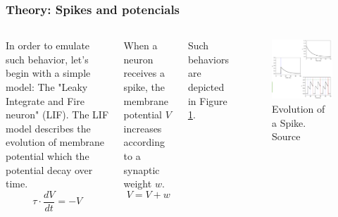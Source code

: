 \begin{frame}
	\frametitle{Theory: Spikes and potencials}
	
	\begin{columns}
			\par In order to emulate such behavior, let's begin with a simple model: The "Leaky Integrate and Fire neuron" (LIF). The LIF model describes the evolution of membrane potential which the potential decay over time.
			\begin{equation}
				\tau \cdot \frac{dV}{dt} = -V
				\label{eq:leak}
			\end{equation}
			
			\par When a neuron receives a spike, the membrane potential $V$ increases according to a synaptic weight $w$.
			\begin{equation}
				V = V + w
			\end{equation}
			
			\par Such behaviors are depicted in Figure \ref{fig:neuronspikes2}.
			\begin{figure}
				\centering
				\includegraphics[width=.87\linewidth]{images/neuronSpikes2}
				\caption{Evolution of a Spike. Source \cite{dan_goodman_2022_7044500}}
				\label{fig:neuronspikes2}
			\end{figure}
	\end{columns}

\end{frame}

